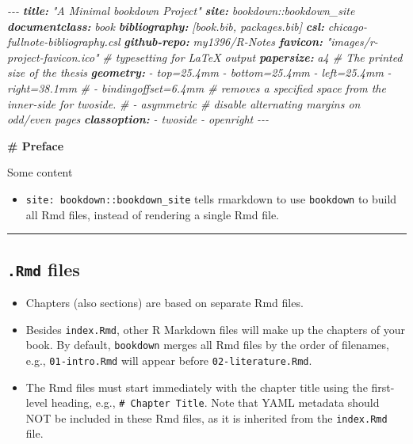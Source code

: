 \documentclass[
  a4paper,
  twoside,
  openright]{book}
\newenvironment{Shaded}{\begin{snugshade}}{\end{snugshade}}
\newcommand{\AnnotationTok}[1]{\textcolor[rgb]{0.56,0.35,0.01}{\textbf{\textit{#1}}}}
\newcommand{\CommentTok}[1]{\textcolor[rgb]{0.56,0.35,0.01}{\textit{#1}}}
\newcommand{\FunctionTok}[1]{\textcolor[rgb]{0.13,0.29,0.53}{\textbf{#1}}}
\newcommand{\NormalTok}[1]{#1}
\providecommand{\tightlist}{%
  \setlength{\itemsep}{0pt}\setlength{\parskip}{0pt}}
\theoremstyle{definition}
\theoremstyle{definition}
\theoremstyle{definition}
\theoremstyle{definition}
\theoremstyle{remark}
\begin{document}
\begin{Shaded}
\begin{Highlighting}[]
\CommentTok{{-}{-}{-}}
\AnnotationTok{title:}\CommentTok{ "A Minimal bookdown Project"}
\AnnotationTok{site:}\CommentTok{ bookdown::bookdown\_site}
\AnnotationTok{documentclass:}\CommentTok{ book}
\AnnotationTok{bibliography:}\CommentTok{ [book.bib, packages.bib]}
\AnnotationTok{csl:}\CommentTok{ chicago{-}fullnote{-}bibliography.csl}
\AnnotationTok{github{-}repo:}\CommentTok{ my1396/R{-}Notes}
\AnnotationTok{favicon:}\CommentTok{ "images/r{-}project{-}favicon.ico"}
\CommentTok{\# typesetting for LaTeX output}
\AnnotationTok{papersize:}\CommentTok{ a4 \# The printed size of the thesis}
\AnnotationTok{geometry:}
\CommentTok{  {-} top=25.4mm}
\CommentTok{  {-} bottom=25.4mm}
\CommentTok{  {-} left=25.4mm}
\CommentTok{  {-} right=38.1mm}
\CommentTok{  \# {-} bindingoffset=6.4mm  \# removes a specified space from the inner{-}side for twoside.}
\CommentTok{  \# {-} asymmetric  \# disable alternating margins on odd/even pages}
\AnnotationTok{classoption:}\CommentTok{ }
\CommentTok{  {-} twoside}
\CommentTok{  {-} openright}
\CommentTok{{-}{-}{-}}

\FunctionTok{\# Preface}

\NormalTok{Some content}
\end{Highlighting}
\end{Shaded}

\begin{itemize}
\tightlist
\item
  \texttt{site:\ bookdown::bookdown\_site} tells rmarkdown to use \texttt{bookdown} to build all Rmd files, instead of rendering a single Rmd file.
\end{itemize}

\begin{center}\rule{0.5\linewidth}{0.5pt}\end{center}

\subsection*{\texorpdfstring{\texttt{.Rmd} files}{.Rmd files}}\label{rmd-files}

\begin{itemize}
\item
  Chapters (also sections) are based on separate Rmd files.
\item
  Besides \texttt{index.Rmd}, other R Markdown files will make up the chapters of your book. By default, \texttt{bookdown} merges all Rmd files by the order of filenames, e.g., \texttt{01-intro.Rmd} will appear before \texttt{02-literature.Rmd}.
\item
  The Rmd files must start immediately with the chapter title using the first-level heading, e.g., \texttt{\#\ Chapter\ Title}. Note that YAML metadata should {NOT} be included in these Rmd files, as it is inherited from the \texttt{index.Rmd} file.
\end{itemize}
\end{document}
